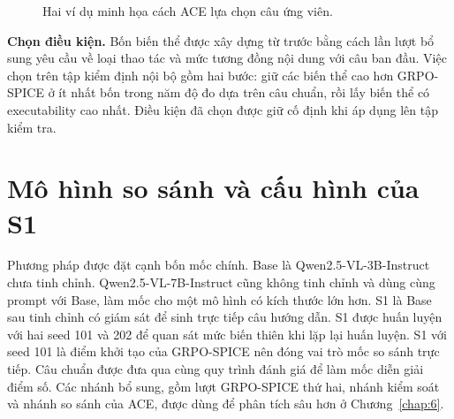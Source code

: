\begin{figure}[!htb]
\caption{Hai ví dụ minh họa cách ACE lựa chọn câu ứng viên.}
\label{fig:4.3}
\end{figure}

\textbf{Chọn điều kiện.} Bốn biến thể được xây dựng từ trước bằng cách lần lượt bổ sung yêu cầu về loại thao tác và mức tương đồng nội dung với câu ban đầu. Việc chọn trên tập kiểm định nội bộ gồm hai bước: giữ các biến thể cao hơn GRPO-SPICE ở ít nhất bốn trong năm độ đo dựa trên câu chuẩn, rồi lấy biến thể có executability cao nhất. Điều kiện đã chọn được giữ cố định khi áp dụng lên tập kiểm tra.

\section{Mô hình so sánh và cấu hình của S1}\label{sec:4.7}\label{sec:4.3}\label{sec:4.8}

Phương pháp được đặt cạnh bốn mốc chính. Base là Qwen2.5-VL-3B-Instruct~\cite{qwen25vl} chưa tinh chỉnh. Qwen2.5-VL-7B-Instruct cũng không tinh chỉnh và dùng cùng prompt với Base, làm mốc cho một mô hình có kích thước lớn hơn. S1 là Base sau tinh chỉnh có giám sát để sinh trực tiếp câu hướng dẫn. S1 được huấn luyện với hai seed 101 và 202 để quan sát mức biến thiên khi lặp lại huấn luyện. S1 với seed 101 là điểm khởi tạo của GRPO-SPICE nên đóng vai trò mốc so sánh trực tiếp. Câu chuẩn được đưa qua cùng quy trình đánh giá để làm mốc diễn giải điểm số. Các nhánh bổ sung, gồm lượt GRPO-SPICE thứ hai, nhánh kiểm soát và nhánh so sánh của ACE, được dùng để phân tích sâu hơn ở Chương~\ref{chap:6}.

